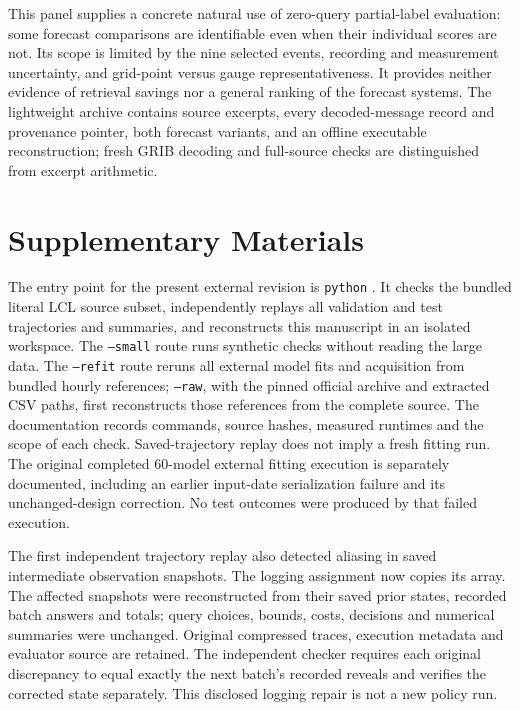 \documentclass[12pt]{article}
\begin{document}
This panel supplies a concrete natural use of zero-query partial-label
evaluation: some forecast comparisons are identifiable even when their
individual scores are not. Its scope is limited by the nine selected events,
recording and measurement uncertainty, and grid-point versus gauge
representativeness. It provides neither evidence of retrieval savings nor
a general ranking of the forecast systems. The lightweight archive contains
source excerpts, every decoded-message record and provenance pointer, both
forecast variants, and an offline executable reconstruction; fresh GRIB
decoding and full-source checks are distinguished from excerpt arithmetic.


\FloatBarrier
\section*{Supplementary Materials}
The entry point for the present external revision is
\texttt{python} . It checks the bundled
literal LCL source subset, independently replays all validation and test
trajectories and summaries, and reconstructs this manuscript in an isolated
workspace. The \texttt{--small} route runs synthetic checks without reading
the large data. The \texttt{--refit} route reruns all external model fits and
acquisition from bundled hourly references; \texttt{--raw}, with the pinned
official archive and extracted CSV paths, first reconstructs those references
from the complete source. The documentation records commands, source hashes,
measured runtimes and the scope of each check. Saved-trajectory replay does
not imply a fresh fitting run. The original completed 60-model external
fitting execution is separately documented, including an earlier input-date
serialization failure and its unchanged-design correction. No test outcomes
were produced by that failed execution.

The first independent trajectory replay also detected aliasing in saved
intermediate observation snapshots. The logging assignment now copies its
array. The affected snapshots were reconstructed from their saved prior
states, recorded batch answers and totals; query choices, bounds, costs,
decisions and numerical summaries were unchanged. Original compressed
traces, execution metadata and evaluator source are retained. The independent
checker requires each original discrepancy to equal exactly the next
batch's recorded reveals and verifies the corrected state separately.
This disclosed logging repair is not a new policy run.
\end{document}
